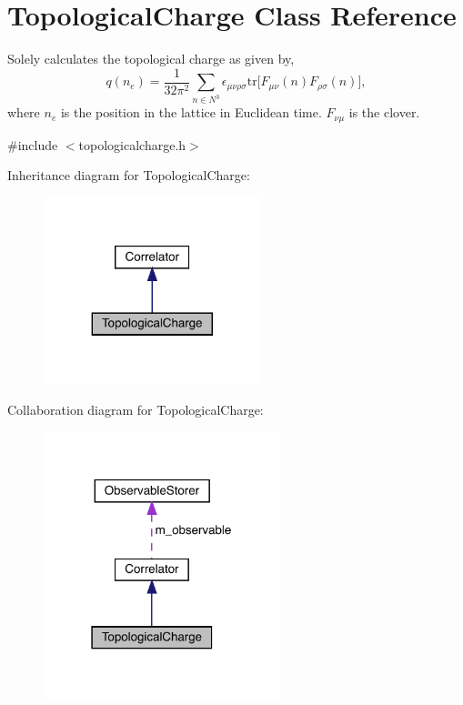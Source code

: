 \hypertarget{class_topological_charge}{}\section{Topological\+Charge Class Reference}
\label{class_topological_charge}


Solely calculates the topological charge as given by, \[ q(n_e) = \frac{1}{32\pi^2} \sum_{n \in N^3} \epsilon_{\mu\nu\rho\sigma} \mathrm{tr}\big[F_{\mu\nu}(n)F_{\rho\sigma}(n)\big], \] where $n_e$ is the position in the lattice in Euclidean time. $F_{\nu\mu}$ is the clover.  




{\ttfamily \#include $<$topologicalcharge.\+h$>$}



Inheritance diagram for Topological\+Charge\+:
\nopagebreak
\begin{figure}[H]
\begin{center}
\leavevmode
\includegraphics[width=179pt]{class_topological_charge__inherit__graph}
\end{center}
\end{figure}


Collaboration diagram for Topological\+Charge\+:
\nopagebreak
\begin{figure}[H]
\begin{center}
\leavevmode
\includegraphics[width=195pt]{class_topological_charge__coll__graph}
\end{center}
\end{figure}
